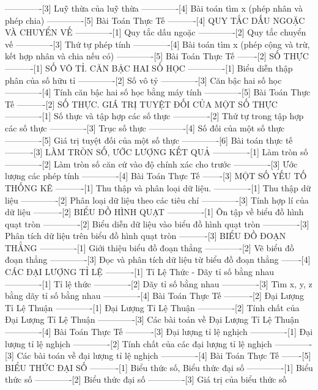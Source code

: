 -------------[3] Luỹ thừa của luỹ thừa
-------------[4] Bài toán tìm x (phép nhân và phép chia)
-------------[5] Bài Toán Thực Tế
----------[4] QUY TẮC DẤU NGOẶC VÀ CHUYỂN VẾ
-------------[1] Quy tắc dấu ngoặc
-------------[2] Quy tắc chuyển vế
-------------[3] Thứ tự phép tính
-------------[4] Bài toán tìm x (phép cộng và trừ, kết hợp nhân và chia nếu có)
-------------[5] Bài Toán Thực Tế
-------[2] SỐ THỰC
----------[1] SỐ VÔ TỈ. CĂN BẬC HAI SỐ HỌC
-------------[1] Biểu diễn thập phân của số hữu tỉ
-------------[2] Số vô tỷ
-------------[3] Căn bậc hai số học
-------------[4] Tính căn bậc hai số học bằng máy tính
-------------[5] Bài Toán Thực Tế
----------[2] SỐ THỰC. GIÁ TRỊ TUYỆT ĐỐI CỦA MỘT SỐ THỰC
-------------[1] Số thực và tập hợp các số thực
-------------[2] Thứ tự trong tập hợp các số thực
-------------[3] Trục số thực
-------------[4] Số đối của một số thực
-------------[5] Giá trị tuyệt đối của một số thực
-------------[6] Bài toán thực tế
----------[3] LÀM TRÒN SỐ, ƯỚC LƯỢNG KẾT QUẢ
-------------[1] Làm tròn số
-------------[2] Làm tròn số căn cứ vào độ chính xác cho trước
-------------[3] Ước lượng các phép tính
-------------[4] Bài Toán Thực Tế
-------[3] MỘT SỐ YẾU TỐ THỐNG KÊ
----------[1] Thu thập và phân loại dữ liệu.
-------------[1] Thu thập dữ liệu
-------------[2] Phân loại dữ liệu theo các tiêu chí
-------------[3] Tính hợp lí của dữ liệu
----------[2] BIỂU ĐỒ HÌNH QUẠT
-------------[1] Ôn tập về biểu đồ hình quạt tròn
-------------[2] Biểu diễn dữ liệu vào biểu đồ hình quạt tròn
-------------[3] Phân tích dữ liệu trên biểu đồ hình quạt tròn
----------[3] BIỂU ĐỒ ĐOẠN THẲNG
-------------[1] Giới thiệu biểu đồ đoạn thẳng
-------------[2] Vẽ biểu đồ đoạn thẳng
-------------[3] Đọc và phân tích dữ liệu từ biểu đồ đoạn thẳng
-------[4] CÁC ĐẠI LƯỢNG TỈ LỆ
----------[1] Tỉ Lệ Thức - Dãy tỉ số bằng nhau
-------------[1] Tỉ lệ thức
-------------[2] Dãy tỉ số bằng nhau
-------------[3] Tìm x, y, z bằng dãy tỉ số bằng nhau
-------------[4] Bài Toán Thực Tế
----------[2] Đại Lượng Tỉ Lệ Thuận
-------------[1] Đại Lượng Tỉ Lệ Thuận
-------------[2] Tính chất của Đại Lượng Tỉ Lệ Thuận
-------------[3] Các bài toán về Đại Lượng Tỉ Lệ Thuận
-------------[4] Bài Toán Thực Tế
----------[3] Đại lượng tỉ lệ nghịch
-------------[1] Đại lượng tỉ lệ nghịch
-------------[2] Tính chất của các đại lượng tỉ lệ nghịch
-------------[3] Các bài toán về đại lượng tỉ lệ nghịch
-------------[4] Bài Toán Thực Tế
-------[5] BIỂU THỨC ĐẠI SỐ
----------[1] Biểu thức số, Biểu thức đại số
-------------[1] Biểu thức số
-------------[2] Biểu thức đại số
-------------[3] Giá trị của biểu thức số
